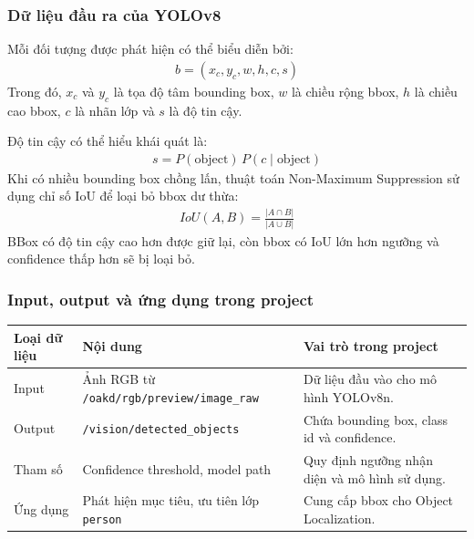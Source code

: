 \subsubsection{Dữ liệu đầu ra của YOLOv8}

Mỗi đối tượng được phát hiện có thể biểu diễn bởi:
\begin{gather*}b = \left( x_{c},y_{c},w,h,c,s \right)\end{gather*}
Trong đó, \(x_{c}\) và \(y_{c}\) là tọa độ tâm bounding box, \(w\) là
chiều rộng bbox, \(h\) là chiều cao bbox, \(c\) là nhãn lớp và \(s\) là
độ tin cậy.

Độ tin cậy có thể hiểu khái quát là:
\begin{gather*}s = P\left( \text{object} \right)\, P\left( c \mid \text{object} \right)\end{gather*}
Khi có nhiều bounding box chồng lấn, thuật toán Non-Maximum Suppression
sử dụng chỉ số IoU để loại bỏ bbox dư thừa:
\begin{gather*}IoU(A,B) = \frac{|A \cap B|}{|A \cup B|}\end{gather*}
BBox có độ tin cậy cao hơn được giữ lại, còn bbox có IoU lớn hơn ngưỡng
và confidence thấp hơn sẽ bị loại bỏ.

\subsubsection{Input, output và ứng dụng trong project}

\renewcommand{\arraystretch}{1.25}
\begin{longtable}{|
  >{\raggedright\arraybackslash}p{}|
  >{\raggedright\arraybackslash}p{}|
  >{\raggedright\arraybackslash}p{}|}
\hline
\textbf{Loại dữ liệu} & \textbf{Nội dung} & \textbf{Vai trò trong project} \\ \hline
\hline
\endhead
\hline
\endlastfoot
Input & Ảnh RGB từ \texttt{/oakd/rgb/}\allowbreak\texttt{preview/}\allowbreak\texttt{image\_raw} & Dữ liệu đầu
vào cho mô hình YOLOv8n. \\ \hline
Output & \texttt{/vision/}\allowbreak\texttt{detected\_objects} & Chứa bounding box, class
id và confidence. \\ \hline
Tham số & Confidence threshold, model path & Quy định ngưỡng nhận diện
và mô hình sử dụng. \\ \hline
Ứng dụng & Phát hiện mục tiêu, ưu tiên lớp \texttt{person} & Cung cấp
bbox cho Object Localization. \\ \hline
\end{longtable}

